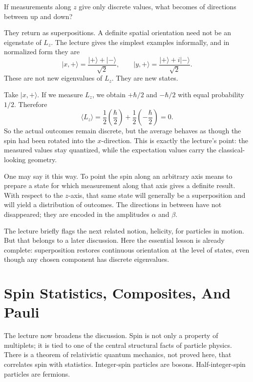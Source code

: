 If measurements along \(z\) give only discrete values, what becomes of directions between up and down?

They return as superpositions. A definite spatial orientation need not be an eigenstate of \(L_z\). The lecture gives the simplest examples informally, and in normalized form they are
\begin{equation}
\lvert x,+\rangle=\frac{\lvert+\rangle+\lvert-\rangle}{\sqrt2},
\qquad
\lvert y,+\rangle=\frac{\lvert+\rangle+i\lvert-\rangle}{\sqrt2}.
\end{equation}
These are not new eigenvalues of \(L_z\). They are new states.

Take \(\lvert x,+\rangle\). If we measure \(L_z\), we obtain \(+\hbar/2\) and \(-\hbar/2\) with equal probability \(1/2\). Therefore
\begin{equation}
\langle L_z\rangle
=
\frac12\left(\frac{\hbar}{2}\right)
+
\frac12\left(-\frac{\hbar}{2}\right)
=0.
\end{equation}
So the actual outcomes remain discrete, but the average behaves as though the spin had been rotated into the \(x\)-direction. This is exactly the lecture's point: the measured values stay quantized, while the expectation values carry the classical-looking geometry.

One may say it this way. To point the spin along an arbitrary axis means to prepare a state for which measurement along that axis gives a definite result. With respect to the \(z\)-axis, that same state will generally be a superposition and will yield a distribution of outcomes. The directions in between have not disappeared; they are encoded in the amplitudes \(\alpha\) and \(\beta\).

The lecture briefly flags the next related notion, helicity, for particles in motion. But that belongs to a later discussion. Here the essential lesson is already complete: superposition restores continuous orientation at the level of states, even though any chosen component has discrete eigenvalues.

\section{Spin Statistics, Composites, And Pauli}

The lecture now broadens the discussion. Spin is not only a property of multiplets; it is tied to one of the central structural facts of particle physics. There is a theorem of relativistic quantum mechanics, not proved here, that correlates spin with statistics. Integer-spin particles are bosons. Half-integer-spin particles are fermions.

